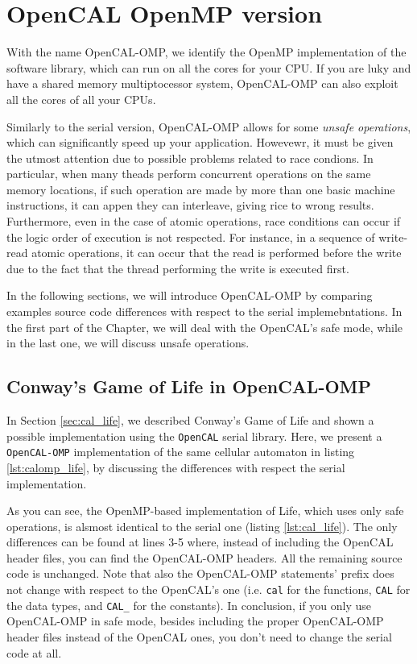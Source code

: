 \chapter{OpenCAL OpenMP version}

With the name OpenCAL-OMP, we identify the OpenMP implementation of
the software library, which can run on all the cores for your CPU. If
you are luky and have a shared memory multiptocessor system,
OpenCAL-OMP can also exploit all the cores of all your CPUs.

Similarly to the serial version, OpenCAL-OMP allows for some
\emph{unsafe operations}, which can significantly speed up your
application. Howevewr, it must be given the utmost attention due to
possible problems related to race condions. In particular, when many
theads perform concurrent operations on the same memory locations, if
such operation are made by more than one basic machine instructions,
it can appen they can interleave, giving rice to wrong
results. Furthermore, even in the case of atomic operations, race
conditions can occur if the logic order of execution is not
respected. For instance, in a sequence of write-read atomic
operations, it can occur that the read is performed before the write
due to the fact that the thread performing the write is executed
first.

In the following sections, we will introduce OpenCAL-OMP by comparing
examples source code differences with respect to the serial
implemebntations. In the first part of the Chapter, we will deal with
the OpenCAL's safe mode, while in the last one, we will discuss unsafe
operations.

\section{Conway's Game of Life in OpenCAL-OMP}

In Section \ref{sec:cal_life}, we described Conway's Game of Life and
shown a possible implementation using the \verb'OpenCAL' serial
library. Here, we present a \verb'OpenCAL-OMP' implementation of the
same cellular automaton in listing \ref{lst:calomp_life}, by
discussing the differences with respect the serial implementation.



As you can see, the OpenMP-based implementation of Life, which uses
only safe operations, is alsmost identical to the serial one (listing
\ref{lst:cal_life}). The only differences can be found at lines 3-5
where, instead of including the OpenCAL header files, you can find the
OpenCAL-OMP headers. All the remaining source code is unchanged. Note
that also the OpenCAL-OMP statements' prefix does not change with
respect to the OpenCAL's one (i.e. \verb'cal' for the functions,
\verb'CAL' for the data types, and \verb'CAL_' for the constants). In
conclusion, if you only use OpenCAL-OMP in safe mode, besides
including the proper OpenCAL-OMP header files instead of the OpenCAL
ones, you don't need to change the serial code at all.

